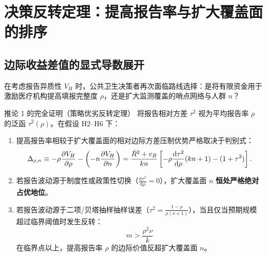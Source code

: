 \section{决策反转定理：提高报告率与扩大覆盖面的排序}
\label{sec:part07}

\subsection{边际收益差值的显式导数展开}

在考虑报告异质性 $V_H$ 时，公共卫生决策者再次面临路线选择：是将有限资金用于激励医疗机构提高填报完整度 $\rho$，还是扩大监测覆盖的哨点网络与人群 $n$？

\begin{theorembox}{推论 1 的完全证明（策略优劣反转定理）}
将报告相对方差 $\tau^2$ 视为平均报告率 $\rho$ 的泛函 $\tau^2(\rho)$。在假设 H2--H6 下：
\begin{enumerate}[label=(\roman*)]
  \item 提高报告率相较于扩大覆盖面的相对边际方差压制优势严格取决于判别式：
  \begin{equation}
    \Delta_{\rho, n} \equiv -\rho\frac{\partial V_H}{\partial \rho} - \left(-n\frac{\partial V_H}{\partial n}\right) = \frac{\bar{R}^2 + v_R}{kn} \left[ -\rho\frac{\mathrm{d}\tau^2}{\mathrm{d}\rho}(kn + 1) - (1 + \tau^2) \right].
    \label{eq:reversal-condition}
  \end{equation}
  \item 若报告波动源于制度性或政策性切换（$\frac{\mathrm{d}\tau^2}{\mathrm{d}\rho} = 0$），扩大覆盖面 $n$ \textbf{恒处严格绝对占优地位}。
  \item 若报告波动源于二项/贝塔抽样抽样误差（$\tau^2 = \frac{1-\rho}{\rho(\nu+1)}$），当且仅当预期规模超过临界阈值时发生反转：
  \begin{equation}
    \boxed{\, m > \frac{\rho^2 \nu}{k} \,}
    \label{eq:reversal-threshold}
  \end{equation}
  在临界点以上，提高报告率 $\rho$ 的边际价值反超扩大覆盖面 $n$。
\end{enumerate}
\end{theorembox}

